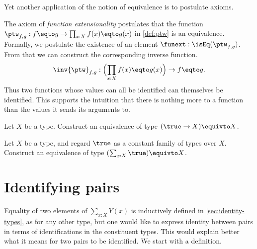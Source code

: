 Yet another application of the notion of equivalence is to postulate axioms.

\begin{principle}\label{def:funext}
The axiom of \emph{function extensionality} postulates that the function
$\ptw_{f,g}: f \eqto g \to \prod_{x:X} f(x) \eqto g(x)$ in \cref{def:ptw} is an equivalence.
Formally, we postulate the existence of an element $\funext : \isEq(\ptw_{f,g})$.
From that we can construct the corresponding inverse function.
\[
\inv{\ptw}_{f,g}: \Bigl(\prod_{x:X} f(x) \eqto g(x)\Bigr) \to f \eqto g.
\]
Thus two functions whose values can all be identified can themselves be identified.
This supports the intuition that there is nothing more to a function than the values
it sends its arguments to.
\end{principle}

\begin{xca}
  Let $X$ be a type.  Construct an equivalence of type $( \true \to X ) \equivto X $.
\end{xca}

\begin{xca}
  Let $X$ be a type, and regard $\true$ as a constant family of types over $X$.
  Construct an equivalence of type $( \sum_{x:X} \true ) \equivto X $.
\end{xca}

\section{Identifying pairs}\label{sec:pairpaths}

Equality of two elements of $\sum _{x:X} Y(x)$ is inductively defined in \cref{sec:identity-types}, as for any other type, but
one would like to express identity between pairs in terms of identifications in the constituent types.  This would explain better what it means for
two pairs to be identified.  We start with a definition.


